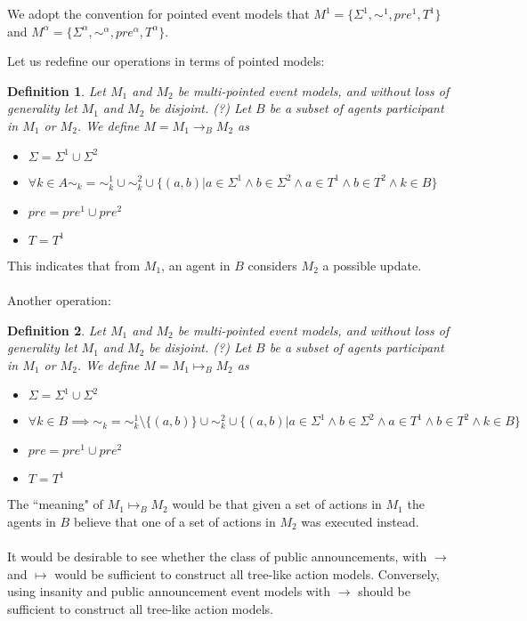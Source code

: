 \documentclass[12pt, a4paper, titlepage]{scrartcl}
\newtheorem{defn}{Definition}
\begin{document}
We adopt the convention for pointed event models that $M^1 = \{\Sigma^1, \sim^1,
pre^1, T^1\}$ and $M^\alpha = \{\Sigma^\alpha,\sim^\alpha,pre^\alpha,T^\alpha\}$.

Let us redefine our operations in terms of pointed models:
\begin{defn} \label{possOne}
Let $M_1$ and $M_2$ be multi-pointed event models, and without loss of
generality let $M_1$ and $M_2$ be disjoint. (?)
Let $B$ be a subset of agents participant in $M_1$ or $M_2$.
We define $M = M_1 \to_B M_2$ as 
\begin{itemize}
  \item $\Sigma = \Sigma^1 \cup \Sigma^2$
  \item $\forall k \in A \sim_k = \sim^1_k \cup \sim^2_k \cup \{(a, b) | a \in \Sigma^1 \land b \in
  \Sigma^2 \land a \in T^1 \land b \in T^2 \land k \in B\}$
  \item $pre = pre^1 \cup pre^2$
  \item $T = T^1$
\end{itemize}
\end{defn}

This indicates that from $M_1$, an agent in $B$ considers $M_2$ a possible
update.\\
\\

Another operation:
\begin{defn} \label{possTwo}
Let $M_1$ and $M_2$ be multi-pointed event models, and without loss of
generality let $M_1$ and $M_2$ be disjoint. (?)
Let $B$ be a subset of agents participant in $M_1$ or $M_2$.
We define $M = M_1 \mapsto_B M_2$ as 
\begin{itemize}
  \item $\Sigma = \Sigma^1 \cup \Sigma^2$
  \item $\forall k \in B \implies \sim_k = \sim^1_k \setminus \{ (a,b) \} \cup \sim^2_k \cup \{(a, b) | a \in \Sigma^1 \land b \in
  \Sigma^2 \land a \in T^1 \land b \in T^2 \land k \in B \}$
  \item $pre = pre^1 \cup pre^2$
  \item $T = T^1$
\end{itemize}
\end{defn}

The ``meaning" of $M_1 \mapsto_B M_2$ would be that given a set of actions in
$M_1$ the agents in $B$ believe that one of a set of actions in $M_2$ was
executed instead.\\
\\
It would be desirable to see whether the class of public announcements, with
$\to$ and $\mapsto$ would be sufficient to construct all tree-like action
models.
Conversely, using insanity and public announcement event models with $\to$ should be sufficient to construct
all tree-like action models.
\end{document}
